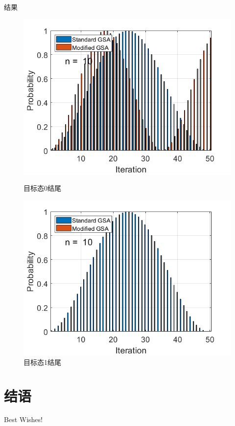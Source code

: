 \documentclass{beamer}
\begin{document}
\begin{frame}{结果}
    \begin{figure}[htbp]
        \centering
        \begin{minipage}[t]{0.48\textwidth}
            \centering
            \includegraphics[scale=0.37]{pic/normal.png}
            \caption{目标态0结尾}
        \end{minipage}
        \begin{minipage}[t]{0.48\textwidth}
            \centering
            \includegraphics[scale=0.37]{pic/unnormal.png}
            \caption{目标态1结尾}
        \end{minipage}
    \end{figure}
\end{frame}

\section*{结语}

\begin{frame}
    \begin{center}
        {\Huge\calligra Best Wishes!}
    \end{center}
\end{frame}
\end{document}
